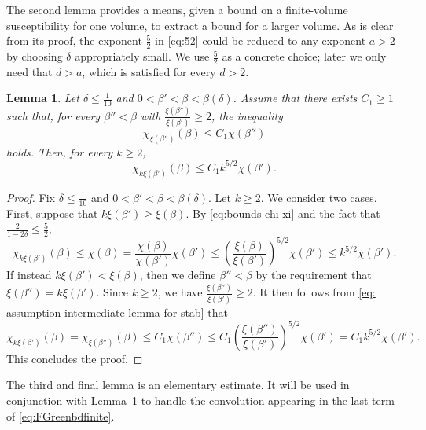 \documentclass[11pt,a4paper]{article}
\numberwithin{equation}{section}
\theoremstyle{plain}
\newtheorem{Lem}[Thm]{Lemma}
\theoremstyle{definition}
\newcommand\1{\mathds{1}}
\begin{document}
The second lemma provides a means, given a bound on
a finite-volume susceptibility for one volume, to extract a bound for a larger volume. As is clear from
its proof,
the exponent $\frac 52$ in \eqref{eq:52} could be reduced to any exponent
$a>2$ by choosing $\delta$ appropriately small.
We use $\frac 52$ as a concrete choice; later we only need that $d>a$,
which is satisfied for every $d > 2$.


\begin{Lem}
\label{Lem:am2} Let $\delta\leq \frac{1}{10}$ and $0<\beta'<\beta<\beta(\delta)$. Assume that there exists $C_1\geq 1$ such that, for every $\beta''<\beta$ with $\frac{\xi(\beta'')}{\xi(\beta')}\geq2$, the inequality
    \begin{equation}\label{eq: assumption intermediate lemma for stab}
        \chi_{\xi(\beta'')}(\beta)\leq C_1 \chi(\beta'')
    \end{equation}
    holds. Then, for every $k\geq 2$,
    \begin{equation}
    \label{eq:52}
        \chi_{k \xi(\beta')}(\beta) \leq C_1 k^{5/2} \chi(\beta').
    \end{equation}
\end{Lem}

\begin{proof}
    Fix $\delta\leq\frac{1}{10}$ and $0<\beta'<\beta<\beta(\delta)$. Let $k\geq 2$. We consider two cases. First, suppose that $k\xi(\beta')\geq\xi(\beta)$. By \eqref{eq:bounds chi xi} and the fact that $\tfrac{2}{1-2\delta}\leq \tfrac{5}{2}$,
    \begin{equation}
        \chi_{k \xi(\beta')}(\beta) \leq \chi(\beta) = \frac{\chi(\beta)}{\chi(\beta')} \chi(\beta') \leq \left(\frac{\xi(\beta)}{\xi(\beta')}\right)^{5/2} \chi(\beta') \leq k^{5/2}\chi(\beta').
    \end{equation}
If instead $k\xi(\beta')<\xi(\beta)$, then we define $\beta''<\beta$ by the
requirement that $\xi(\beta'') = k \xi(\beta')$.
Since $k\geq 2$, we have $\tfrac{\xi(\beta'')}{\xi(\beta')}\geq 2$.
It then follows from \eqref{eq: assumption intermediate lemma for stab} that
\begin{equation}
        \chi_{k \xi(\beta')}(\beta) = \chi_{\xi(\beta'')}(\beta) \leq C_1 \chi(\beta'') \leq C_1\left(\frac{\xi(\beta'')}{\xi(\beta')}\right)^{5/2} \chi(\beta') = C_1 k^{5/2}\chi(\beta').
\end{equation}
    This concludes the proof.
\end{proof}

The third and final lemma is an elementary estimate.
It will be used in conjunction with Lemma~\ref{Lem:am2}
to handle the convolution appearing in the
last term of \eqref{eq:FGreenbdfinite}.
\end{document}
